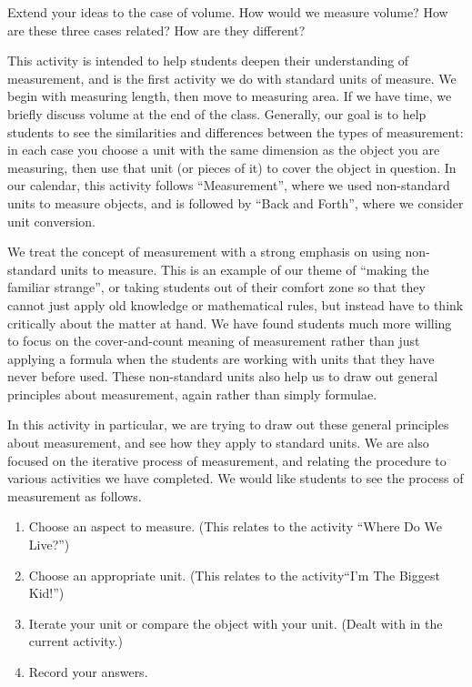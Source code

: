 \documentclass[handout]{ximera}
\begin{document}
\begin{problem}
Extend your ideas to the case of volume.  How would we measure volume?  How are these three cases related?  How are they different?
\end{problem}


\newpage
\begin{instructorNotes}
This activity is intended to help students deepen their understanding of measurement, and is the first activity we do with standard units of measure.  We begin with measuring length, then move to measuring area.  If we have time, we briefly discuss volume at the end of the class.  Generally, our goal is to help students to see the similarities and differences between the types of measurement: in each case you choose a unit with the same dimension as the object you are measuring, then use that unit (or pieces of it) to cover the object in question.  In our calendar, this activity follows ``Measurement'', where we used non-standard units to measure objects, and is followed by ``Back and Forth'', where we consider unit conversion.

We treat the concept of measurement with a strong emphasis on using non-standard units to measure.  This is an example of our theme of ``making the familiar strange'', or taking students out of their comfort zone so that they cannot just apply old knowledge or mathematical rules, but instead have to think critically about the matter at hand.  We have found students much more willing to focus on the cover-and-count meaning of measurement rather than just applying a formula when the students are working with units that they have never before used.  These non-standard units also help us to draw out general principles about measurement, again rather than simply formulae.

In this activity in particular, we are trying to draw out these general principles about measurement, and see how they apply to standard units.  We are also focused on the iterative process of measurement, and relating the procedure to various activities we have completed.  We would like students to see the process of measurement as follows.
\begin{enumerate}
    \item Choose an aspect to measure. (This relates to the activity ``Where Do We Live?'')
    \item Choose an appropriate unit.  (This relates to  the activity``I'm The Biggest Kid!'')
    \item Iterate your unit or compare the object with your unit.  (Dealt with in the current activity.)
    \item Record your answers.
\end{enumerate}


\end{instructorNotes}
\end{document}
